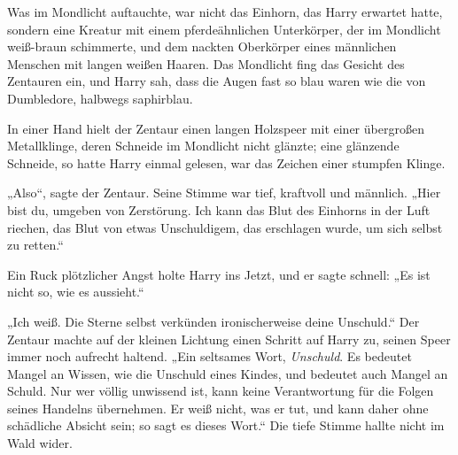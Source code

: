 Was im Mondlicht auftauchte, war nicht das Einhorn, das Harry erwartet hatte, sondern eine Kreatur mit einem pferdeähnlichen Unterkörper, der im Mondlicht weiß-braun schimmerte, und dem nackten Oberkörper eines männlichen Menschen mit langen weißen Haaren. Das Mondlicht fing das Gesicht des Zentauren ein, und Harry sah, dass die Augen fast so blau waren wie die von Dumbledore, halbwegs saphirblau.

In einer Hand hielt der Zentaur einen langen Holzspeer mit einer übergroßen Metallklinge, deren Schneide im Mondlicht nicht glänzte; eine glänzende Schneide, so hatte Harry einmal gelesen, war das Zeichen einer stumpfen Klinge.

„Also“, sagte der Zentaur. Seine Stimme war tief, kraftvoll und männlich.
„Hier bist du, umgeben von Zerstörung. Ich kann das Blut des Einhorns in der Luft riechen, das Blut von etwas Unschuldigem, das erschlagen wurde, um sich selbst zu retten.“

Ein Ruck plötzlicher Angst holte Harry ins Jetzt, und er sagte schnell:
„Es ist nicht so, wie es aussieht.“

„Ich weiß. Die Sterne selbst verkünden ironischerweise deine Unschuld.“
Der Zentaur machte auf der kleinen Lichtung einen Schritt auf Harry zu, seinen Speer immer noch aufrecht haltend.
„Ein seltsames Wort, \emph{Unschuld}. Es bedeutet Mangel an Wissen, wie die Unschuld eines Kindes, und bedeutet auch Mangel an Schuld. Nur wer völlig unwissend ist, kann keine Verantwortung für die Folgen seines Handelns übernehmen. Er weiß nicht, was er tut, und kann daher ohne schädliche Absicht sein; so sagt es dieses Wort.“
Die tiefe Stimme hallte nicht im Wald wider.

